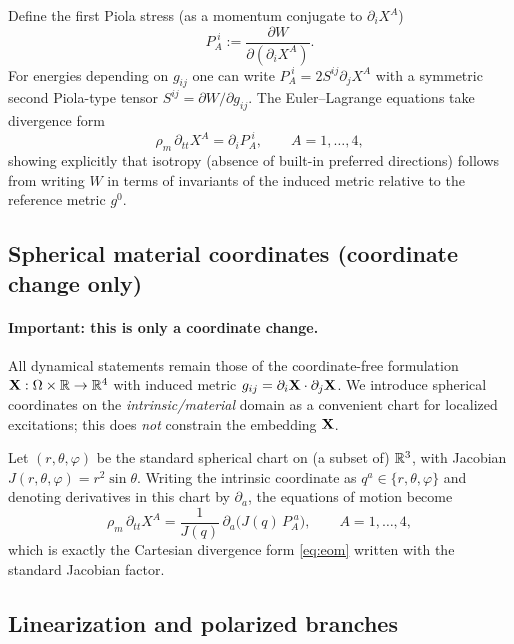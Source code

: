 Define the first Piola stress (as a momentum conjugate to $\partial_i X^A$)
\begin{equation}
  P_A^{\;i} := \frac{\partial W}{\partial(\partial_i X^A)}.
  \label{eq:piola-def}
\end{equation}
For energies depending on $g_{ij}$ one can write $P_A^{\;i}=2S^{ij}\partial_j X^A$ with a symmetric
second Piola-type tensor $S^{ij}=\partial W/\partial g_{ij}$.
The Euler--Lagrange equations take divergence form
\begin{equation}
  \rho_m\,\partial_{tt} X^A = \partial_i P_A^{\;i},
  \qquad A=1,\dots,4,
  \label{eq:eom}
\end{equation}
showing explicitly that isotropy (absence of built-in preferred directions) follows from writing
$W$ in terms of invariants of the induced metric relative to the reference metric $g^0$.

\subsection{Spherical material coordinates (coordinate change only)}
\label{subsec:spherical-material-coords}

\paragraph{Important: this is only a coordinate change.}
All dynamical statements remain those of the coordinate-free formulation
$\mathbf{X}:\Omega\times\mathbb{R}\to\mathbb{R}^4$ with induced metric $g_{ij}=\partial_i\mathbf{X}\cdot\partial_j\mathbf{X}$.
We introduce spherical coordinates on the \emph{intrinsic/material} domain as a convenient chart for localized
excitations; this does \emph{not} constrain the embedding $\mathbf{X}$.

Let $(r,\theta,\varphi)$ be the standard spherical chart on (a subset of) $\mathbb{R}^3$, with Jacobian
$J(r,\theta,\varphi)=r^2\sin\theta$.
Writing the intrinsic coordinate as $q^a\in\{r,\theta,\varphi\}$ and denoting derivatives in this chart by $\partial_a$,
the equations of motion become
\begin{equation}
  \rho_m\,\partial_{tt}X^A
  =\frac{1}{J(q)}\,\partial_a\!\Big(J(q)\,P_A^{\;a}\Big),
  \qquad A=1,\dots,4,
  \label{eq:eom-spherical}
\end{equation}
which is exactly the Cartesian divergence form \eqref{eq:eom} written with the standard Jacobian factor.

\subsection{Linearization and polarized branches}

